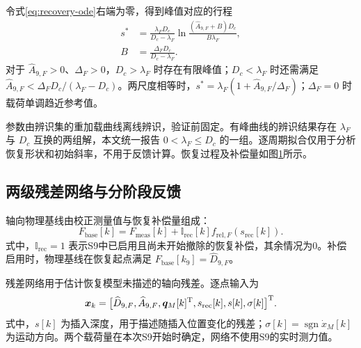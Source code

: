 \documentclass{JQRnew}
\begin{document}
令式\eqref{eq:recovery-ode}右端为零，得到峰值对应的行程
\begin{equation}
\label{eq:peak-location}
\begin{aligned}
s^*&=\frac{\lambda_FD_c}{D_c-\lambda_F}
\ln\frac{(\widehat A_{9,F}+B)D_c}{B\lambda_F},\\
B&=\frac{\Delta_FD_c}{D_c-\lambda_F}.
\end{aligned}
\end{equation}
对于 $\widehat A_{9,F}>0$、$\Delta_F>0$，$D_c>\lambda_F$ 时存在有限峰值；$D_c<\lambda_F$ 时还需满足 $\widehat A_{9,F}<\Delta_FD_c/(\lambda_F-D_c)$。两尺度相等时，$s^*=\lambda_F(1+\widehat A_{9,F}/\Delta_F)$；$\Delta_F=0$ 时载荷单调趋近参考值。

参数由辨识集的重加载曲线离线辨识，验证前固定。有峰曲线的辨识结果存在 $\lambda_F$ 与 $D_c$ 互换的两组解，本文统一报告 $0<\lambda_F\le D_c$ 的一组。逐周期拟合仅用于分析恢复形状和初始斜率，不用于反馈计算。恢复过程及补偿量如图\ref{fig3}所示。

\begin{figure}[H]
\centering
{}
\label{fig3}
\end{figure}

\subsection{两级残差网络与分阶段反馈}

轴向物理基线由校正测量值与恢复补偿量组成：
\begin{equation}
\label{eq:physical-baseline}
F_{\mathrm{base}}[k]=F_{\mathrm{meas}}[k]
+\mathbb I_{\mathrm{rec}}[k]f_{\mathrm{rel},F}(s_{\mathrm{rec}}[k]).
\end{equation}
式中，$\mathbb I_{\mathrm{rec}}=1$ 表示S9中已启用且尚未开始撤除的恢复补偿，其余情况为0。补偿启用时，物理基线在恢复起点满足 $F_{\mathrm{base}}[k_9]=\widehat D_{9,F}$。

残差网络用于估计恢复模型未描述的轴向残差。逐点输入为
\begin{equation}
\label{eq:gru-input}
\bm x_k=\big[\widehat D_{9,F},\widehat A_{9,F},
\bm q_M[k]^{\rm T},s_{\mathrm{rec}}[k],s[k],\sigma[k]\big]^{\rm T}.
\end{equation}
式中，$s[k]$ 为插入深度，用于描述随插入位置变化的残差；$\sigma[k]=\operatorname{sgn}\dot x_M[k]$ 为运动方向。两个载荷量在本次S9开始时确定，网络不使用S9的实时测力值。
\end{document}
